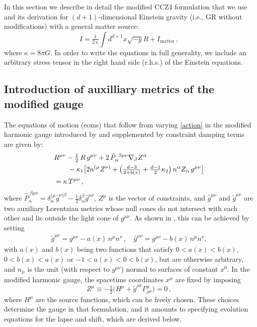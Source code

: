 \documentclass[reprint,aps,amsmath,amssymb,twoside,prd,showkeys,superscriptaddress,nofootinbib]{revtex4-2}
\begin{document}
In this section we describe in detail the modified CCZ4 formulation that we use and its derivation for $(d+1)$-dimensional Einstein gravity (i.e., GR without modifications) with a general matter source:
\begin{equation}
    I = \tfrac{1}{2\,\kappa}\int d^{d+1}x\sqrt{-g}R+I_{\text{matter}}\,,
    \label{action}
\end{equation}
where $\kappa = 8\pi G$. In order to write the equations in full generality, we include an arbitrary stress tensor in the right hand side (r.h.s.) of the Einstein equations. 

\subsection{Introduction of auxilliary metrics of the modified gauge}

The equations of motion (eoms) that follow from varying \eqref{action} in the modified harmonic gauge introduced by \cite{Kovacs:2020ywu, Kovacs:2020pns} and supplemented by constraint damping terms are given by:
\begin{align} \label{ESFE}
&R^{\mu\nu}-\tfrac{1}{2}\, R \,g^{\mu\nu}+2\,\hat{P}_{\alpha}^{~\beta\mu\nu}\nabla_{\beta}Z^{\alpha}\nonumber
\\
&\hspace{0.7cm}-\kappa_1\big[2n^{(\mu}Z^{\nu)}+\big(\tfrac{d-3}{2+b(x)}+\tfrac{d-1}{2}\kappa_2\big)\,n^{\alpha}Z_{\alpha}\,g^{\mu\nu}\big]\nonumber\\
&= \kappa\,T^{\mu\nu} \,,
\end{align}
where $\hat{P}_{\alpha}^{~\beta\mu\nu}=\delta_{\alpha}^{(\mu}\hat{g}_{\phantom{a}}^{\nu)\beta}-\frac{1}{2}\delta_{\alpha}^{\beta}\hat{g}^{\mu\nu}$,  $Z^{\mu}$ is the vector of constraints, and $\hat{g}^{\mu\nu}$ and $\tilde{g}^{\mu\nu}$ are two auxiliary Lorentzian metrics whose null cones do not intersect with each other and lie outside the light cone of $g^{\mu\nu}$. As shown in \cite{Kovacs:2020ywu}, this can be achieved by setting
\begin{eqnarray}\label{abfunc}
\tilde{g}^{\mu\nu}=g^{\mu\nu}-a(x)\,n^{\mu}n^{\nu}\,, \quad \hat{g}^{\mu\nu}=g^{\mu\nu}-b(x)\,n^{\mu}n^{\nu},
\end{eqnarray}
with $a(x)$ and $b(x)$ being two functions that satisfy $0<a(x)<b(x)$, $0<b(x)<a(x)$ or $-1<a(x)<0<b(x)$, but are otherwise arbitrary, and $n_{\mu}$ is the unit (with respect to $g^{\mu\nu}$) normal to surfaces of constant $x^0$.  In the modified harmonic gauge, the spacetime coordinates $x^\mu$ are fixed by imposing
\begin{equation}
    Z^{\mu}\equiv-\tfrac{1}{2}\big(H^{\mu}+\tilde{g}^{\rho\sigma} \Gamma^{\mu}_{\rho\sigma}\big) =0\,,
\end{equation}
where $H^\mu$ are the source functions, which can be freely chosen. These choices determine the gauge in that formulation, and it amounts to specifying evolution equations for the lapse and shift, which are derived below.
\end{document}
